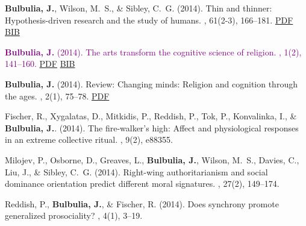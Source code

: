 \documentclass{article}
\begin{document}
\begin{thebibliography}{99}
{\bf Bulbulia, J.}, Wilson, M.~S., \& Sibley, C.~G. (2014).
\newblock Thin and thinner: Hypothesis-driven research and the study of humans.
, 61(2-3), 166--181. 
\href{https://www.dropbox.com/s/7gj657l635ap143/NU_061_02-03_166-181.pdf?dl=0}{PDF} 
\href{https://www.dropbox.com/s/p8t8m02g13fbubu/15685276-12341314.bib?dl=0}{BIB}


\textcolor{Purple}{
{\bf Bulbulia, J.} (2014).
\newblock The arts transform the cognitive science of religion.
, 1(2), 141--160.}
\newblock \href{https://www.dropbox.com/s/gbz16yryorq7egu/pdfgt3Nzf.pdf}{PDF} 
\href{https://www.dropbox.com/s/3l1bebxg4cln7q0/2014.BulbuliaArts.bib?dl=0}{BIB}

{\bf Bulbulia, J.} (2014).
\newblock Review: Changing minds: Religion and cognition through the ages.
, 2(1), 75--78. 
\href{https://www.dropbox.com/s/8sttr3tn8j4zwo5/2014.bulbulia.article.review.Czachesz.Biro.pdf?dl=0}{PDF}


Fischer, R., Xygalatas, D., Mitkidis, P., Reddish, P., Tok, P., Konvalinka, I.,
  \& {\bf Bulbulia, J.}. (2014).
\newblock The fire-walker's high: Affect and physiological responses in an
  extreme collective ritual.
, 9(2), e88355. 


Milojev, P., Osborne, D., Greaves, L., {\bf Bulbulia, J.}, Wilson, M.~S., Davies, C., Liu, J., \& Sibley, C.~G. (2014).
\newblock Right-wing authoritarianism and social dominance orientation predict
  different moral signatures.
, 27(2), 149--174. 


Reddish, P., {\bf Bulbulia, J.}, \& Fischer, R. (2014).
\newblock Does synchrony promote generalized prosociality?
, 4(1), 3--19. 



\end{thebibliography}
\end{document}
